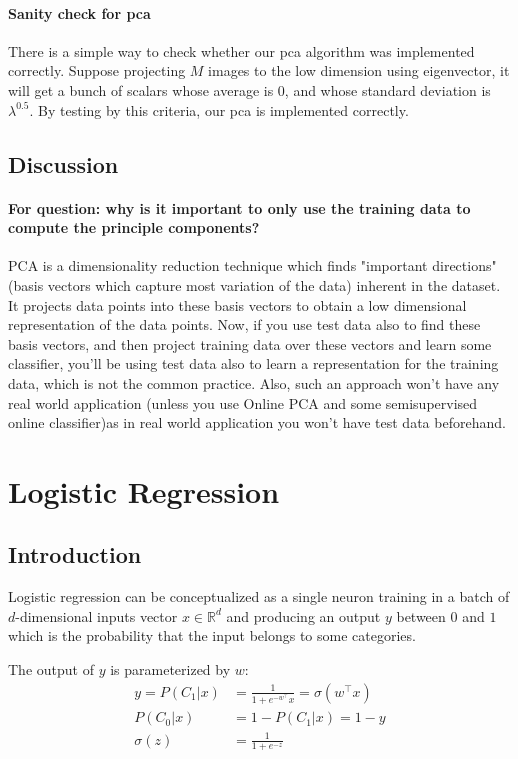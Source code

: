 \documentclass{article}
\begin{document}
\paragraph{Sanity check for pca} There is a simple way to check whether our pca algorithm was implemented correctly. Suppose projecting $M$ images to the low dimension using eigenvector, it will get a bunch of scalars whose average is 0, and whose standard deviation is $\lambda^{0.5}$. By testing by this criteria, our pca is implemented correctly.
\subsection{Discussion}
\paragraph{For question: why is it important to only use the training data to compute the principle components?
}
PCA is a dimensionality reduction technique which finds "important directions" (basis vectors which capture most variation of the data) inherent in the dataset. It projects data points into these basis vectors to obtain a low dimensional representation of the data points. Now, if you use test data also to find these basis vectors, and then project training data over these vectors and learn some classifier, you'll be using test data also to learn a representation for the training data, which is not the common practice. Also, such an approach won't have any real world application (unless you use Online PCA and some semisupervised online classifier)as in real world application you won't have test data beforehand.

\section{Logistic Regression}

\subsection{Introduction}

Logistic regression can be conceptualized as a single neuron training in a batch of $d$-dimensional inputs vector $x\in \mathbb{R}^{d}$ and producing an output $y$ between $0$ and $1$ which is the probability that the input belongs to some categories.

The output of $y$ is parameterized by $w$:
\begin{align}
    y = P(C_{1}|x) &= \frac{1}{1+e^{-w^{\top}}x} = \sigma(w^{\top}x) \\
    P(C_{0}|x) &= 1 - P(C_{1}|x) = 1 - y \\
    \sigma(z) &= \frac{1}{1+e^{-z}}
\end{align}
\end{document}
